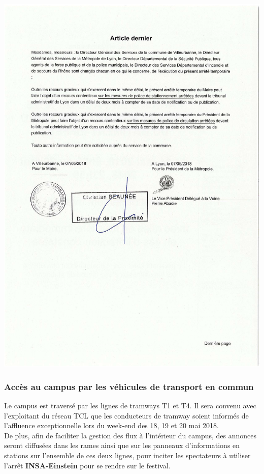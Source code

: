 \documentclass[hidelinks, paper=a4, fontsize=13pt]{report}
\begin{document}
\begin{center}
\includegraphics[scale = 0.7]{Annexes/Documents/VilleurbanneCirculation5}
\end{center}

\subsubsection{Accès au campus par les véhicules de transport en commun}

Le campus est traversé par les lignes de tramways T1 et T4. Il sera convenu avec l’exploitant du réseau TCL que les conducteurs de tramway soient informés de l’affluence exceptionnelle lors du week-end des 18, 19 et 20 mai 2018.\\

De plus, afin de faciliter la gestion des flux à l’intérieur du campus, des annonces seront diffusées dans les rames ainsi que sur les panneaux d’informations en stations sur l’ensemble de ces deux lignes, pour inciter les spectateurs à utiliser l’arrêt \textbf{INSA-Einstein} pour se rendre sur le festival.\\
\end{document}
